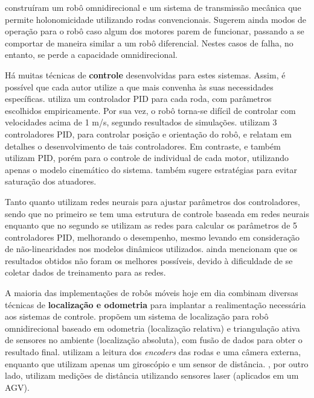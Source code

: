 \cite{jung2001fault} construíram um robô omnidirecional e um sistema de transmissão mecânica que permite holonomicidade utilizando rodas convencionais. Sugerem ainda modos de operação para o robô caso algum dos motores parem de funcionar, passando a se comportar de maneira similar a um robô diferencial. Nestes casos de falha, no entanto, se perde a capacidade omnidirecional.

Há muitas técnicas de \textbf{controle} desenvolvidas para estes sistemas. Assim, é possível que cada autor utilize a que mais convenha às suas necessidades específicas. \cite{ritter2016modelagem} utiliza um controlador PID para cada roda, com parâmetros escolhidos empiricamente. Por sua vez, o robô torna-se difícil de controlar com velocidades acima de 1 m/s, segundo resultados de simulações. \cite{samani2007comprehensive} utilizam 3 controladores PID, para controlar posição e orientação do robô, e relatam em detalhes o desenvolvimento de tais controladores. Em contraste, \cite{rojas2006holonomic} e \cite{indiveri2009swedish} também utilizam PID, porém para o controle de individual de cada motor, utilizando apenas o modelo cinemático do sistema. \cite{indiveri2009swedish} também sugere estratégias para evitar saturação dos atuadores.

Tanto \cite{treesatayapun2011discrete} quanto \cite{oubbati2005velocity} utilizam redes neurais para ajustar parâmetros dos controladores, sendo que no primeiro se tem uma estrutura de controle baseada em redes neurais enquanto que no segundo se utilizam as redes para calcular os parâmetros de 5 controladores PID, melhorando o desempenho, mesmo levando em consideração de não-linearidades nos modelos dinâmicos utilizados. \cite{oubbati2005velocity} ainda mencionam que os resultados obtidos não foram os melhores possíveis, devido à dificuldade de se coletar dados de treinamento para as redes.

A maioria das implementações de robôs móveis hoje em dia combinam diversas técnicas de \textbf{localização e odometria} para implantar a realimentação necessária aos sistemas de controle. \cite{ginzburg2013indoor} propõem um sistema de localização para robô omnidirecional baseado em odometria (localização relativa) e triangulação ativa de sensores no ambiente (localização absoluta), com fusão de dados para obter o resultado final. \cite{rojas2006holonomic} utilizam a leitura dos \emph{encoders} das rodas e uma câmera externa, enquanto que \cite{garcia2015gyro} utilizam apenas um giroscópio e um sensor de distância. \cite{rohrig2010laser}, por outro lado, utilizam medições de distância utilizando sensores laser (aplicados em um AGV).

